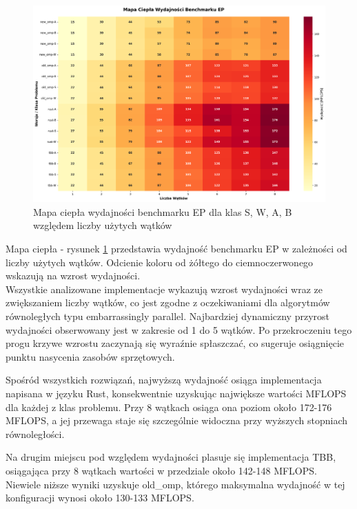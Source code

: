 \begin{figure}[H]
    \centering
    \includegraphics[width=\textwidth]{analiza/images/parallel/ep/x86/ep_mapa_ciepla_wydajnosci.png}
    \caption{Mapa ciepła wydajności benchmarku EP dla klas S, W, A, B względem liczby użytych wątków}
    \label{ep_heatmap_wydajnosci_x86_64}
\end{figure}
Mapa ciepła - rysunek \ref{ep_heatmap_wydajnosci_x86_64} przedstawia wydajność benchmarku EP w zależności od liczby użytych wątków. Odcienie koloru od żółtego do ciemnoczerwonego wskazują na wzrost wydajności.\\


Wszystkie analizowane implementacje wykazują wzrost wydajności wraz ze zwiększaniem liczby wątków, co jest zgodne z oczekiwaniami dla algorytmów równoległych typu embarrassingly parallel. Najbardziej dynamiczny przyrost wydajności obserwowany jest w zakresie od 1 do 5 wątków. Po przekroczeniu tego progu krzywe wzrostu zaczynają się wyraźnie spłaszczać, co sugeruje osiągnięcie punktu nasycenia zasobów sprzętowych.

Spośród wszystkich rozwiązań, najwyższą wydajność osiąga implementacja napisana w języku Rust, konsekwentnie uzyskując największe wartości MFLOPS dla każdej z klas problemu. Przy 8 wątkach osiąga ona poziom około 172-176 MFLOPS, a jej przewaga staje się szczególnie widoczna przy wyższych stopniach równoległości.

Na drugim miejscu pod względem wydajności plasuje się implementacja TBB, osiągająca przy 8 wątkach wartości w przedziale około 142-148 MFLOPS. Niewiele niższe wyniki uzyskuje old\_omp, którego maksymalna wydajność w tej konfiguracji wynosi około 130-133 MFLOPS.

